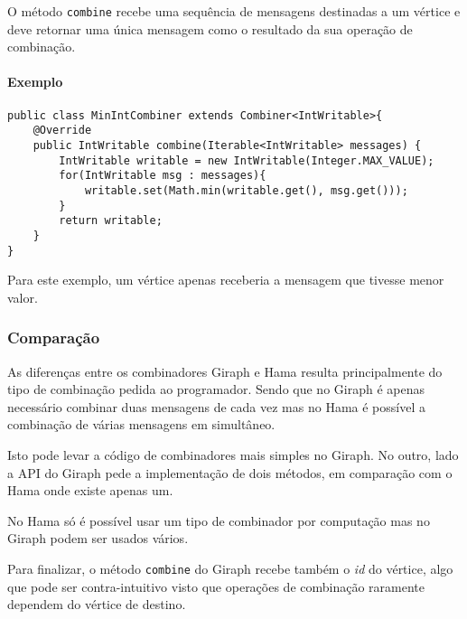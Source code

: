 O método \texttt{combine} recebe uma sequência de mensagens destinadas a um 
vértice e deve retornar uma única mensagem como o resultado da sua operação de 
combinação.

\paragraph{Exemplo}
\begin{verbatim}
public class MinIntCombiner extends Combiner<IntWritable>{
	@Override
	public IntWritable combine(Iterable<IntWritable> messages) {
		IntWritable writable = new IntWritable(Integer.MAX_VALUE);
		for(IntWritable msg : messages){
			writable.set(Math.min(writable.get(), msg.get()));
		}	
		return writable;
	}
}
\end{verbatim}
Para este exemplo, um vértice apenas receberia a mensagem que tivesse menor 
valor.

\subsubsection*{Comparação}
As diferenças entre os combinadores Giraph e Hama resulta principalmente do tipo de combinação pedida ao programador. Sendo que no Giraph é apenas necessário combinar duas mensagens de cada vez mas no Hama é possível a combinação de várias mensagens em simultâneo.

Isto pode levar a código de combinadores mais simples no Giraph. No outro, lado a API do Giraph pede a implementação de dois métodos, em comparação com o Hama onde existe apenas um.

No Hama só é possível usar um tipo de combinador por computação mas no Giraph podem ser usados vários.

Para finalizar, o método \texttt{combine} do Giraph recebe também o \textit{id} do vértice, algo que pode ser contra-intuitivo visto que operações de combinação raramente dependem do vértice de destino.
